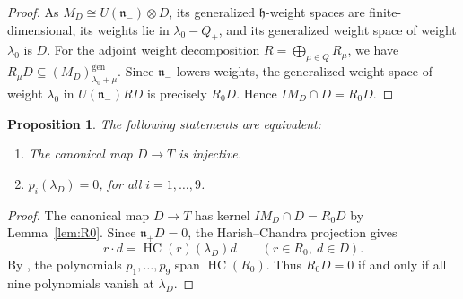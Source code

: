 \documentclass[11pt]{amsart}
\numberwithin{equation}{section}
\newtheorem{proposition}[theorem]{Proposition}
\theoremstyle{definition}
\theoremstyle{remark}
\newcommand{\h}{\mathfrak h}
\newcommand{\nplus}{\mathfrak n_+}
\newcommand{\nminus}{\mathfrak n_-}
\newcommand{\HC}{\operatorname{HC}}
\begin{document}
{\begin{proof}
As $M_D\cong U(\nminus)\otimes D$, its generalized $\h$-weight
spaces are finite-dimensional, its weights lie in $\lambda_0-Q_+$,
and its generalized weight space of weight $\lambda_0$ is $D$.
For the adjoint weight decomposition $R=\bigoplus_{\mu\in Q}R_\mu$,
we have $R_\mu D\subseteq (M_D)_{\lambda_0+\mu}^{\mathrm{gen}}$.
Since $\nminus$ lowers weights, the generalized weight space of
weight $\lambda_0$ in $U(\nminus)RD$ is precisely $R_0D$.
Hence $IM_D\cap D=R_0D$.
    \end{proof}
    \begin{proposition}\label{prop-inj-equiv}
    	The following statements are equivalent:
    	\begin{enumerate}
    		\item The canonical map $D \longrightarrow T$ is injective.
    		\item $p_i (\lambda_D) = 0$, for all $i=1,\ldots,9$.
    	\end{enumerate}
    \end{proposition}
\begin{proof}
The canonical map $D\longrightarrow T$ has kernel $IM_D\cap D=R_0D$
by Lemma~\ref{lem:R0}. Since $\nplus D=0$, the Harish--Chandra
projection gives
\[
 r\cdot d=\HC(r)(\lambda_D)d \qquad (r\in R_0,\ d\in D).
\]
By \cite[Lemma~3.3]{AV}, the polynomials $p_1,\ldots,p_9$ span
$\HC(R_0)$. Thus $R_0D=0$ if and only if all nine polynomials
vanish at $\lambda_D$.
\end{proof}
}
\end{document}
